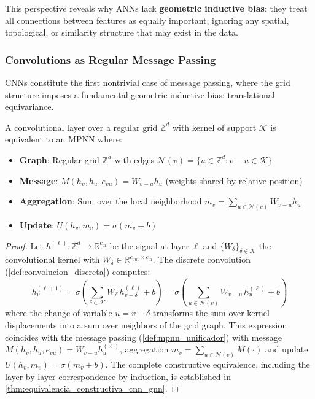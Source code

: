 This perspective reveals why \glspl{ANN} lack \textbf{geometric inductive bias}: they treat all connections between features as equally important, ignoring any spatial, topological, or similarity structure that may exist in the data.

\subsubsection{Convolutions as Regular Message Passing}

\glspl{CNN} constitute the first nontrivial case of message passing, where the grid structure imposes a fundamental geometric inductive bias: translational equivariance.

\begin{proposition}\label{prop:cnn_mpnn}
A convolutional layer over a regular grid $\mathbb{Z}^d$ with kernel of support $\mathcal{K}$ is equivalent to an \gls{MPNN} where:
\begin{itemize}
    \item \textbf{Graph}: Regular grid $\mathbb{Z}^d$ with edges $\mathcal{N}(v) = \{u \in \mathbb{Z}^d : v - u \in \mathcal{K}\}$
    \item \textbf{Message}: $M(h_v, h_u, e_{vu}) = W_{v-u} h_u$ (weights shared by relative position)
    \item \textbf{Aggregation}: Sum over the local neighborhood $m_v = \sum_{u \in \mathcal{N}(v)} W_{v-u} h_u$
    \item \textbf{Update}: $U(h_v, m_v) = \sigma(m_v + b)$
\end{itemize}
\end{proposition}

\begin{proof}
Let $h^{(\ell)}: \mathbb{Z}^d \to \mathbb{R}^{c_{\mathrm{in}}}$ be the signal at layer $\ell$ and $\{W_\delta\}_{\delta \in \mathcal{K}}$ the convolutional kernel with $W_\delta \in \mathbb{R}^{c_{\mathrm{out}} \times c_{\mathrm{in}}}$. The discrete convolution (\autoref{def:convolucion_discreta}) computes:
\[
h_v^{(\ell+1)} = \sigma\!\left(\sum_{\delta \in \mathcal{K}} W_\delta\, h_{v-\delta}^{(\ell)} + b\right) = \sigma\!\left(\sum_{u \in \mathcal{N}(v)} W_{v-u}\, h_u^{(\ell)} + b\right)
\]
where the change of variable $u = v - \delta$ transforms the sum over kernel displacements into a sum over neighbors of the grid graph. This expression coincides with the message passing (\autoref{def:mpnn_unificador}) with message $M(h_v, h_u, e_{vu}) = W_{v-u} h_u^{(\ell)}$, aggregation $m_v = \sum_{u \in \mathcal{N}(v)} M(\cdot)$ and update $U(h_v, m_v) = \sigma(m_v + b)$. The complete constructive equivalence, including the layer-by-layer correspondence by induction, is established in \autoref{thm:equivalencia_constructiva_cnn_gnn}.
\end{proof}

